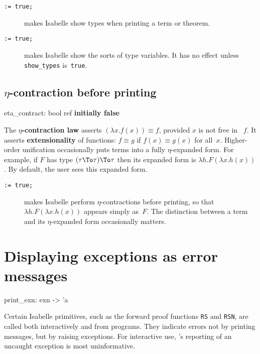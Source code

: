 \begin{description}
\item[ \tt:= true;]
makes Isabelle show types when printing a term or theorem.

\item[ \tt:= true;]
makes Isabelle show the sorts of type variables.  It has no effect unless
{\tt show_types} is~{\tt true}. 
\end{description}


\subsection{$\eta$-contraction before printing}
\begin{ttbox} 
eta_contract: bool ref \hfill{\bf initially false}
\end{ttbox}
The {\bf $\eta$-contraction law} asserts $(\lambda x.f(x))\equiv f$,
provided $x$ is not free in ~$f$.  It asserts {\bf extensionality} of
functions: $f\equiv g$ if $f(x)\equiv g(x)$ for all~$x$.  Higher-order
unification occasionally puts terms into a fully $\eta$-expanded form.  For
example, if $F$ has type $(\tau\To\tau)\To\tau$ then its expanded form is
$\lambda h.F(\lambda x.h(x))$.  By default, the user sees this expanded
form.

\begin{description}
\item[ \tt:= true;]
makes Isabelle perform $\eta$-contractions before printing, so that
$\lambda h.F(\lambda x.h(x))$ appears simply as~$F$.  The
distinction between a term and its $\eta$-expanded form occasionally
matters.
\end{description}


\section{Displaying exceptions as error messages}
\begin{ttbox} 
print_exn: exn -> 'a
\end{ttbox}
Certain Isabelle primitives, such as the forward proof functions {\tt RS}
and {\tt RSN}, are called both interactively and from programs.  They
indicate errors not by printing messages, but by raising exceptions.  For
interactive use, \ML's reporting of an uncaught exception is most
uninformative.

